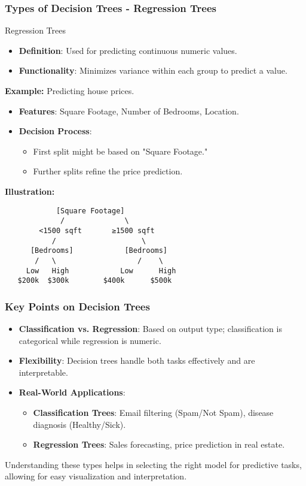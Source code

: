 \documentclass[aspectratio=169]{beamer}
\begin{document}
\begin{frame}[fragile]
    \frametitle{Types of Decision Trees - Regression Trees}
    \begin{block}{Regression Trees}
        \begin{itemize}
            \item \textbf{Definition}: Used for predicting continuous numeric values.
            \item \textbf{Functionality}: Minimizes variance within each group to predict a value.
        \end{itemize}
    \end{block}
    
    \textbf{Example:} Predicting house prices.
    \begin{itemize}
        \item \textbf{Features}: Square Footage, Number of Bedrooms, Location.
        \item \textbf{Decision Process}:
        \begin{itemize}
            \item First split might be based on "Square Footage."
            \item Further splits refine the price prediction.
        \end{itemize}
    \end{itemize}
    
    \textbf{Illustration:}
    \begin{verbatim}
            [Square Footage]
             /              \
        <1500 sqft       ≥1500 sqft
           /                    \
      [Bedrooms]            [Bedrooms]
       /   \                   /    \
     Low   High            Low      High
   $200k  $300k        $400k      $500k
    \end{verbatim}
\end{frame}

\begin{frame}[fragile]
    \frametitle{Key Points on Decision Trees}
    \begin{itemize}
        \item \textbf{Classification vs. Regression}: Based on output type; classification is categorical while regression is numeric.
        \item \textbf{Flexibility}: Decision trees handle both tasks effectively and are interpretable.
        \item \textbf{Real-World Applications}:
        \begin{itemize}
            \item \textbf{Classification Trees}: Email filtering (Spam/Not Spam), disease diagnosis (Healthy/Sick).
            \item \textbf{Regression Trees}: Sales forecasting, price prediction in real estate.
        \end{itemize}
    \end{itemize}
    
    Understanding these types helps in selecting the right model for predictive tasks, allowing for easy visualization and interpretation.
\end{frame}
\end{document}
